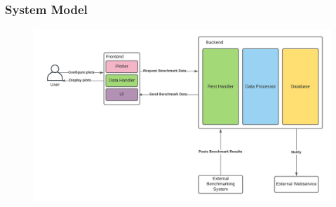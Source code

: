 \begin{frame}
    \frametitle{System Model}
    \begin{figure}[H]
        \includegraphics[width=\textwidth]{images/systemmodel.pdf}
        \label{fig:systemmodel}
    \end{figure}
\end{frame}


